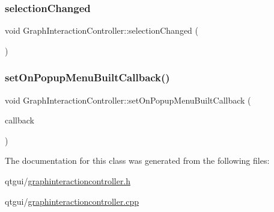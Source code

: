 \mbox{\label{class_graph_interaction_controller_a74523456d82060bb6133761497dfbeb3}} 
\subsubsection{\texorpdfstring{selectionChanged}{selectionChanged}}
{\footnotesize\ttfamily void Graph\+Interaction\+Controller\+::selection\+Changed (\begin{DoxyParamCaption}{ }\end{DoxyParamCaption})\hspace{0.3cm}{\ttfamily [slot]}}

\mbox{\label{class_graph_interaction_controller_a4d5f8af2f6c20647d6320efe5487f5a6}} 
\subsubsection{\texorpdfstring{setOnPopupMenuBuiltCallback()}{setOnPopupMenuBuiltCallback()}}
{\footnotesize\ttfamily void Graph\+Interaction\+Controller\+::set\+On\+Popup\+Menu\+Built\+Callback (\begin{DoxyParamCaption}\item[{\mbox{\hyperlink{class_graph_interaction_controller_a9781ca3edf7c9c5cf3ad12c3496cf24c}{Graph\+Interaction\+Controller\+::\+On\+Popup\+Menu\+Built}}}]{callback }\end{DoxyParamCaption})}



The documentation for this class was generated from the following files\+:\begin{DoxyCompactItemize}
\item 
qtgui/\mbox{\hyperlink{graphinteractioncontroller_8h}{graphinteractioncontroller.\+h}}\item 
qtgui/\mbox{\hyperlink{graphinteractioncontroller_8cpp}{graphinteractioncontroller.\+cpp}}\end{DoxyCompactItemize}

